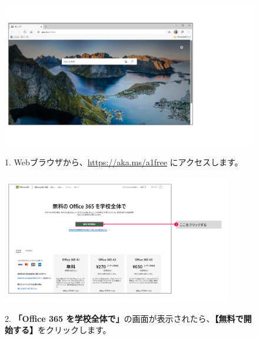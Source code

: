 \begin{figure}[h]
    \begin{minipage}{0.6\textwidth}
        \includegraphics[width=12cm]{figures/O365A1_submission00.png}
    \end{minipage}
    \begin{minipage}{0.4\textwidth}
        1. Webブラウザから、\url{https://aka.ms/a1free} にアクセスします。
    \end{minipage}
\end{figure}


\begin{figure}[h]
    \begin{minipage}{0.6\textwidth}
        \includegraphics[width=10cm]{figures/O365A1_submission01.png}
    \end{minipage}
    \begin{minipage}{0.4\textwidth}
        2. \textbf{「Office 365 を学校全体で」}の画面が表示されたら、\textbf{【無料で開始する】}をクリックします。
    \end{minipage}
\end{figure}

